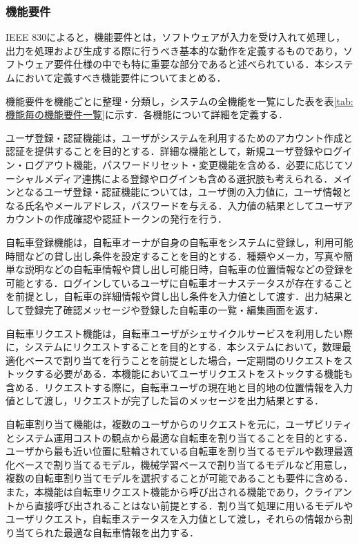       \subsubsection{機能要件}
        \label{sec:機能要件}
          \par IEEE 830によると，機能要件とは，ソフトウェアが入力を受け入れて処理し，出力を処理および生成する際に行うべき基本的な動作を定義するものであり，ソフトウェア要件仕様の中でも特に重要な部分であると述べられている．本システムにおいて定義すべき機能要件についてまとめる．
          \par 機能要件を機能ごとに整理・分類し，システムの全機能を一覧にした表を表\ref{tab:機能毎の機能要件一覧}に示す．各機能について詳細を定義する．
          \par ユーザ登録・認証機能は，ユーザがシステムを利用するためのアカウント作成と認証を提供することを目的とする．詳細な機能として，新規ユーザ登録やログイン・ログアウト機能，パスワードリセット・変更機能を含める．必要に応じてソーシャルメディア連携による登録やログインも含める選択肢も考えられる．メインとなるユーザ登録・認証機能については，ユーザ側の入力値に，ユーザ情報となる氏名やメールアドレス，パスワードを与える．入力値の結果としてユーザアカウントの作成確認や認証トークンの発行を行う．
          \par 自転車登録機能は，自転車オーナが自身の自転車をシステムに登録し，利用可能時間などの貸し出し条件を設定することを目的とする．種類やメーカ，写真や簡単な説明などの自転車情報や貸し出し可能日時，自転車の位置情報などの登録を可能とする．ログインしているユーザに自転車オーナステータスが存在することを前提とし，自転車の詳細情報や貸し出し条件を入力値として渡す．出力結果として登録完了確認メッセージや登録した自転車の一覧・編集画面を返す．
          \par 自転車リクエスト機能は，自転車ユーザがシェサイクルサービスを利用したい際に，システムにリクエストすることを目的とする．本システムにおいて，数理最適化ベースで割り当てを行うことを前提とした場合，一定期間のリクエストをストックする必要がある．本機能においてユーザリクエストをストックする機能も含める．リクエストする際に，自転車ユーザの現在地と目的地の位置情報を入力値として渡し，リクエストが完了した旨のメッセージを出力結果とする．
          \par 自転車割り当て機能は，複数のユーザからのリクエストを元に，ユーザビリティとシステム運用コストの観点から最適な自転車を割り当てることを目的とする．ユーザから最も近い位置に駐輪されている自転車を割り当てるモデルや数理最適化ベースで割り当てるモデル，機械学習ベースで割り当てるモデルなど用意し，複数の自転車割り当てモデルを選択することが可能であることも要件に含める．また，本機能は自転車リクエスト機能から呼び出される機能であり，クライアントから直接呼び出されることはない前提とする．割り当て処理に用いるモデルやユーザリクエスト，自転車ステータスを入力値として渡し，それらの情報から割り当てられた最適な自転車情報を出力する．

